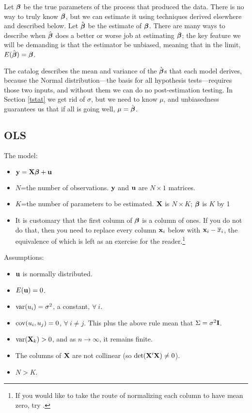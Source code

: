 Let ${\mbox{\boldmath$\beta$}}$ be the true parameters of the process that produced the
data. There is no way to truly know ${\mbox{\boldmath$\beta$}}$, but we can estimate it
using techniques derived elsewhere and described below. Let 
$\hat{{\mbox{\boldmath$\beta$}}}$ be the estimate of ${\mbox{\boldmath$\beta$}}$.  There are many ways to
describe when $\hat{{\mbox{\boldmath$\beta$}}}$ does a better or worse job at estimating 
${\mbox{\boldmath$\beta$}}$; the key feature we will be demanding is that the estimator be
unbiased, meaning that in the limit, $E(\hat{{\mbox{\boldmath$\beta$}}}) = {\mbox{\boldmath$\beta$}}$.

The catalog describes the mean and variance of the $\hat{{\mbox{\boldmath$\beta$}}}$s that
each model derives, because the Normal distribution---the basis for all
hypothesis tests---requires those two inputs,
and without them we can do no post-estimation testing.  
In Section \ref{tstat} we get rid of $\sigma$, but we
need to know $\mu$, and unbiasedness guarantees us that if all is going
well, $\mu =\hat{{\mbox{\boldmath$\beta$}}}$.

\subsection{OLS}
The model: 
\begin{itemize}
\item ${\bf y}={\bf X}{\mbox{\boldmath$\beta$}} + {\bf u}$
\item $N$=the number of observations. ${\bf y}$ and ${\bf u}$ are $N \times 1$
matrices.
\item $K$=the number of parameters to be estimated. ${\bf X}$ is $N \times K$;
${\mbox{\boldmath$\beta$}}$ is $K$ by 1
\item It is customary that the first column of ${\mbox{\boldmath$\beta$}}$ is a column of
ones. If you do not do that, then you need to replace every column ${\bf x}_i$ below
with ${\bf x}_i-\overline x_i$, the equivalence of which is left as an exercise
for the reader.\footnote{If you would like to take the route of
normalizing each column to have mean zero, try
.}
\end{itemize}

Assumptions:

\begin{itemize}
\item ${\bf u}$ is normally distributed.
\item $E({\bf u}) = 0$.
\item $\operatorname{var}(u_i) = \sigma^2$, a constant, $\forall\ i$.
\item $\operatorname{cov}(u_i, u_j) = 0$, $\forall\ i\neq j$. This plus the above rule
mean that $\Sigma =
\sigma^2{\bf I}$.
\item $\operatorname{var}({\bf X}_k)>0$, and as $n\to\infty$, it remains finite.
\item The columns of ${\bf X}$ are not collinear (so $\det({\bf X}'{\bf X})\neq 0$).
\item $N>K$.
\end{itemize}

